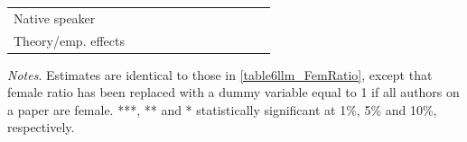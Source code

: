 \begin{table}
\begin{threeparttable}
\begin{tabular}{p{3cm}S@{}S@{}S@{}S@{}S@{}S@{}S@{}S@{}S@{}S@{}S@{}}
            Native speaker                &               &           {}   &               &           {}   &               &           {}   &               &           {}   &               &               &               \\
            Theory/emp. effects           &               &           {}   &               &           {}   &               &           {}   &               &           {}   &               &               &               \\
            \bottomrule
        \end{tabular}
        \begin{tablenotes}
            \tiny
            \item \textit{Notes}. Estimates are identical to those in \autoref{table6llm_FemRatio}, except that female ratio has been replaced with a dummy variable equal to 1 if all authors on a paper are female. ***, ** and * statistically significant at 1\%, 5\% and 10\%, respectively.
        \end{tablenotes}
    \end{threeparttable}

\end{table}
